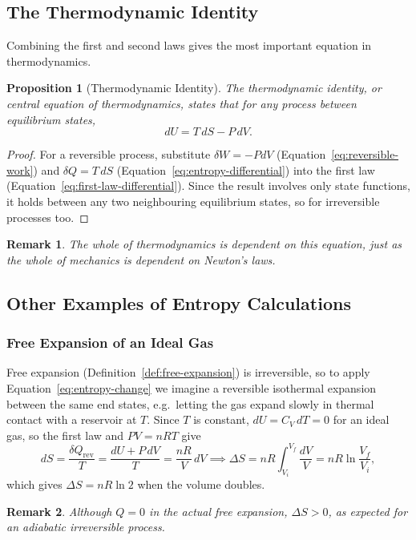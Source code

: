 \documentclass{article}
\newtheorem{remark}{Remark}
\newtheorem{proposition}{Proposition}
\begin{document}
\subsection{The Thermodynamic Identity}
Combining the first and second laws gives the most important equation in thermodynamics.
\begin{proposition}[Thermodynamic Identity]
    The thermodynamic identity, or central equation of thermodynamics, states that for any process between equilibrium states,
    \begin{equation}
        \label{eq:thermodynamic-identity}
        dU = T\,dS - P\,dV.
    \end{equation}
\end{proposition}
\begin{proof}
    For a reversible process, substitute $\delta W = -PdV$ (Equation~\eqref{eq:reversible-work}) and $\delta Q = T\,dS$ (Equation~\eqref{eq:entropy-differential}) into the first law (Equation~\eqref{eq:first-law-differential}). Since the result involves only state functions, it holds between any two neighbouring equilibrium states, so for irreversible processes too.
\end{proof}
\begin{remark}
    The whole of thermodynamics is dependent on this equation, just as the whole of mechanics is dependent on Newton's laws.
\end{remark}

\subsection{Other Examples of Entropy Calculations}
\subsubsection{Free Expansion of an Ideal Gas}
Free expansion (Definition~\ref{def:free-expansion}) is irreversible, so to apply Equation~\eqref{eq:entropy-change} we imagine a reversible isothermal expansion between the same end states, e.g.\ letting the gas expand slowly in thermal contact with a reservoir at $T$. Since $T$ is constant, $dU = C_V\,dT = 0$ for an ideal gas, so the first law and $PV = nRT$ give
\[dS = \frac{\delta Q_{\text{rev}}}{T} = \frac{dU + P\,dV}{T} = \frac{nR}{V}\,dV \implies \Delta S = nR\int_{V_i}^{V_f}\frac{dV}{V} = nR\ln\frac{V_f}{V_i},\]
which gives $\Delta S = nR\ln 2$ when the volume doubles.
\begin{remark}
    Although $Q = 0$ in the actual free expansion, $\Delta S > 0$, as expected for an adiabatic irreversible process.
\end{remark}
\end{document}
